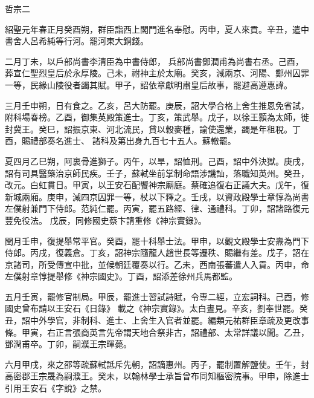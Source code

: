 
\begin{pinyinscope}

 哲宗二



 紹聖元年春正月癸酉朔，群臣詣西上閣門進名奉慰。丙申，夏人來貢。辛丑，遣中書舍人呂希純等行河。罷河東大銅錢。



 二月丁未，以戶部尚書李清臣為中書侍郎，
 兵部尚書鄧潤甫為尚書右丞。己酉，葬宣仁聖烈皇后於永厚陵。己未，祔神主於太廟。癸亥，減兩京、河陽、鄭州囚罪一等，民緣山陵役者蠲其賦。甲子，詔依章獻明肅皇后故事，罷避高遵惠諱。



 三月壬申朔，日有食之。乙亥，呂大防罷。庚辰，詔大學合格上舍生推恩免省試，附科場春榜。乙酉，御集英殿策進士。丁亥，策武舉。戊子，以徐王顥為太師，徙封冀王。癸巳，詔振京東、河北流民，貸以穀麥種，諭使還業，蠲是年租稅。丁酉，賜禮部奏名進士、
 諸科及第出身九百七十五人。蘇轍罷。



 夏四月乙巳朔，阿裏骨進獅子。丙午，以旱，詔恤刑。己酉，詔中外決獄。庚戌，詔有司具醫藥治京師民疾。壬子，蘇軾坐前掌制命語涉譏訕，落職知英州。癸丑，改元。白虹貫日。甲寅，以王安石配饗神宗廟庭。蔡確追復右正議大夫。戊午，復新城兩廂。庚申，減四京囚罪一等，杖以下釋之。壬戌，以資政殿學士章惇為尚書左僕射兼門下侍郎。范純仁罷。丙寅，罷五路經、律、通禮科。丁卯，詔諸路復元豐免役法。
 戊辰，同修國史蔡卞請重修《神宗實錄》。



 閏月壬申，復提舉常平官。癸酉，罷十科舉士法。甲申，以觀文殿學士安燾為門下侍郎。丙戌，復義倉。丁亥，詔神宗隨龍人趙世長等遷秩、賜繼有差。戊子，詔在京諸司，所受傳宣中批，並候朝廷覆奏以行。乙未，西南張蕃遣人入貢。丙申，命左僕射章惇提舉修《神宗國史》。丁酉，詔添差徐州兵馬都監。



 五月壬寅，罷修官制局。甲辰，罷進士習試詩賦，令專二經，立宏詞科。己酉，修國史曾布請以王安石《日錄》
 載之《神宗實錄》。太白晝見。辛亥，劉奉世罷。癸丑，詔中外學官，非制科、進士、上舍生入官者並罷。編類元祐群臣章疏及更改事條。甲寅，右正言張商英言先帝謂天地合祭非古，詔禮部、太常詳議以聞。乙丑，鄧潤甫卒。丁卯，嗣濮王宗暉薨。



 六月甲戌，來之邵等疏蘇軾詆斥先朝，詔謫惠州。丙子，罷制置解鹽使。壬午，封高密郡王宗晟為嗣濮王。癸未，以翰林學士承旨曾布同知樞密院事。甲申，除進士引用王安石《字說》之禁。




\end{pinyinscope}

